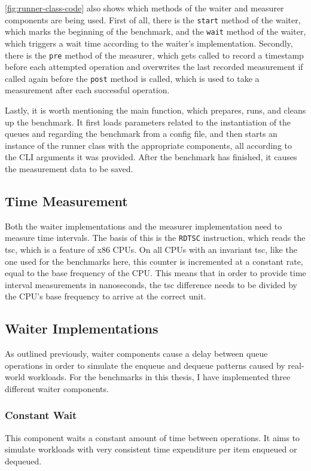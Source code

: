 \autoref{fig:runner-class-code} also shows which methods of the waiter and measurer components are being used.
First of all, there is the \texttt{start} method of the waiter, which marks the beginning of the benchmark,
and the \texttt{wait} method of the waiter, which triggers a wait time according to the waiter's implementation.
Secondly, there is the \texttt{pre} method of the measurer, which gets called to record a timestamp before each
attempted operation and overwrites the last recorded measurement if called again before the \texttt{post}
method is called, which is used to take a measurement after each successful operation.

Lastly, it is worth mentioning the main function, which prepares, runs, and cleans up the benchmark.
It first loads parameters related to the instantiation of the queues and regarding the benchmark from a config file,
and then starts an instance of the runner class with the appropriate components, all according to the CLI
arguments it was provided.
After the benchmark has finished, it causes the measurement data to be saved.

\newpage %
\subsection{Time Measurement}
Both the waiter implementations and the measurer implementation need to measure time intervals.
The basis of this is the \texttt{RDTSC} instruction, which reads the \acrfull{tsc}, which is a
feature of x86 CPUs.
On all CPUs with an invariant \acrshort{tsc}, like the one used for the benchmarks here, this counter is incremented at
a constant rate, equal to the base frequency of the CPU.
This means that in order to provide time interval measurements in nanoseconds, the \acrshort{tsc} difference needs to be
divided by the CPU's base frequency to arrive at the correct unit.

\subsection{Waiter Implementations}
\label{sec:waiter-implementations}
As outlined previously, waiter components cause a delay between queue operations in order to simulate the
enqueue and dequeue patterns caused by real-world workloads.
For the benchmarks in this thesis, I have implemented three different waiter components.

\subsubsection*{Constant Wait}
This component waits a constant amount of time between operations.
It aims to simulate workloads with very consistent time expenditure per item enqueued or dequeued.

